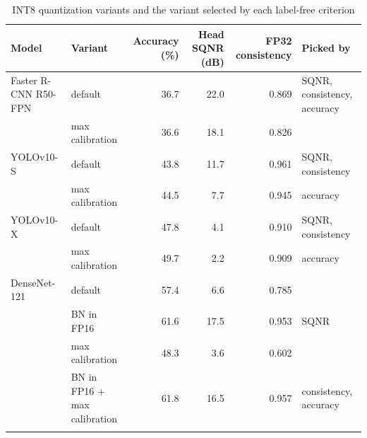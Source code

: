 \begin{table}
\footnotesize\setlength{\tabcolsep}{4pt}
\caption{INT8 quantization variants and the variant selected by each label-free criterion}\label{tab:placement}
\begin{tabular}{@{}llrrrl@{}}
\toprule
Model & Variant & Accuracy (\%) & Head SQNR (dB) & FP32 consistency & Picked by \\
\midrule
Faster R-CNN R50-FPN & default & 36.7 & 22.0 & 0.869 & SQNR, consistency, accuracy \\
 & max calibration & 36.6 & 18.1 & 0.826 &  \\
\midrule
YOLOv10-S & default & 43.8 & 11.7 & 0.961 & SQNR, consistency \\
 & max calibration & 44.5 & 7.7 & 0.945 & accuracy \\
\midrule
YOLOv10-X & default & 47.8 & 4.1 & 0.910 & SQNR, consistency \\
 & max calibration & 49.7 & 2.2 & 0.909 & accuracy \\
\midrule
DenseNet-121 & default & 57.4 & 6.6 & 0.785 &  \\
 & BN in FP16 & 61.6 & 17.5 & 0.953 & SQNR \\
 & max calibration & 48.3 & 3.6 & 0.602 &  \\
 & BN in FP16 + max calibration & 61.8 & 16.5 & 0.957 & consistency, accuracy \\
\botrule
\end{tabular}
\end{table}
